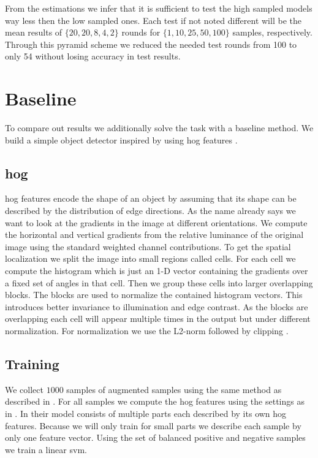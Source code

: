 From the estimations  we infer that it is sufficient to test the high sampled models way less then the low sampled ones. Each test if not noted different will be the mean results of $\{20, 20, 8, 4, 2\}$ rounds for $\{1, 10, 25, 50, 100\}$ samples, respectively. Through this pyramid scheme we reduced the needed test rounds from 100 to only 54 without losing accuracy in test results.


\section{Baseline}
\label{sec:results:baseline}
To compare out results we additionally solve the task with a baseline method. We build a simple object detector inspired by \citet{felzenszwalb_object_2010} using \gls{hog} features \citep{dalal_histograms_2005}.\\

\subsection{\Gls{hog}}
\gls{hog} features encode the shape of an object by assuming that its shape can be described by the distribution of edge directions. As the name already says we want to look at the gradients in the image at different orientations. We compute the horizontal and vertical gradients from the relative luminance of the original image using the standard weighted channel contributions. To get the spatial localization we split the image into small regions called cells. For each cell we compute the histogram which is just an 1-D vector containing the gradients over a fixed set of angles in that cell. Then we group these cells into larger overlapping blocks. The blocks are used to normalize the contained histogram vectors. This introduces better invariance to illumination and edge contrast. As the blocks are overlapping each cell will appear multiple times in the output but under different normalization. For normalization we use the L2-norm followed by clipping \citep{lowe_distinctive_2004}.

\subsection{Training}
We collect $1000$ samples of augmented samples using the same method as described in . For all samples we compute the \gls{hog} features using the settings as in \citep{dalal_histograms_2005}. In \citet{felzenszwalb_object_2010} their model consists of multiple parts each described by its own \gls{hog} features. Because we will only train for small parts we describe each sample by only one feature vector. Using the set of balanced positive and negative samples we train a linear \gls{svm}.

